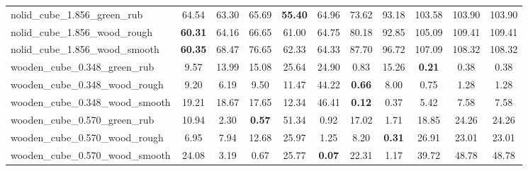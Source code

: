 \begin{table}[H]
{\begin{tabular}{l cccccccccc}
        nolid\_cube\_1.856\_green\_rub & 64.54 & 63.30 & 65.69 & \textbf{55.40} & 64.96 & 73.62 & 93.18 & 103.58 & 103.90 & 103.90 \\
        nolid\_cube\_1.856\_wood\_rough & \textbf{60.31} & 64.16 & 66.65 & 61.00 & 64.75 & 80.18 & 92.85 & 105.09 & 109.41 & 109.41 \\
        nolid\_cube\_1.856\_wood\_smooth & \textbf{60.35} & 68.47 & 76.65 & 62.33 & 64.33 & 87.70 & 96.72 & 107.09 & 108.32 & 108.32 \\
        wooden\_cube\_0.348\_green\_rub & 9.57 & 13.99 & 15.08 & 25.64 & 24.90 & 0.83 & 15.26 & \textbf{0.21} & 0.38 & 0.38 \\
        wooden\_cube\_0.348\_wood\_rough & 9.20 & 6.19 & 9.50 & 11.47 & 44.22 & \textbf{0.66} & 8.00 & 0.75 & 1.28 & 1.28 \\
        wooden\_cube\_0.348\_wood\_smooth & 19.21 & 18.67 & 17.65 & 12.34 & 46.41 & \textbf{0.12} & 0.37 & 5.42 & 7.58 & 7.58 \\
        wooden\_cube\_0.570\_green\_rub & 10.94 & 2.30 & \textbf{0.57} & 51.34 & 0.92 & 17.02 & 1.71 & 18.85 & 24.26 & 24.26 \\
        wooden\_cube\_0.570\_wood\_rough & 6.95 & 7.94 & 12.68 & 25.97 & 1.25 & 8.20 & \textbf{0.31} & 26.91 & 23.01 & 23.01 \\
        wooden\_cube\_0.570\_wood\_smooth & 24.08 & 3.19 & 0.67 & 25.77 & \textbf{0.07} & 22.31 & 1.17 & 39.72 & 48.78 & 48.78 \\
        \bottomrule
    \end{tabular}
    }
\end{table}
